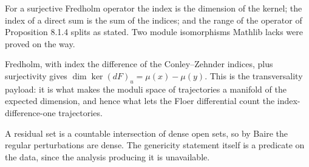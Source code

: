 \begin{proposition}
  \label{prop:8.index}
  \leanok
  For a surjective Fredholm operator the index is the dimension of the kernel;
  the index of a direct sum is the sum of the indices; and the range of the
  operator of Proposition 8.1.4 splits as stated.  Two module isomorphisms
  Mathlib lacks were proved on the way.
\end{proposition}

\begin{theorem}
  \label{thm:8.1.2}
  \leanok
  Fredholm, with index the difference of the Conley--Zehnder indices, plus
  surjectivity gives $\dim\ker (dF)_u = \mu(x)-\mu(y)$.  This is the
  transversality payload: it is what makes the moduli space of trajectories a
  manifold of the expected dimension, and hence what lets the Floer differential
  count the index-difference-one trajectories.
\end{theorem}

\begin{theorem}
  \label{thm:8.1.1}
  \leanok
  A residual set is a countable intersection of dense open sets, so by Baire the
  regular perturbations are dense.  The genericity statement itself is a
  predicate on the data, since the analysis producing it is unavailable.
\end{theorem}

